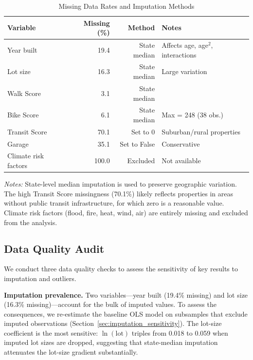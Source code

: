 \begin{table}[H]
\centering
\caption{Missing Data Rates and Imputation Methods}
\label{tab:missing}
\begin{threeparttable}
\small
\begin{tabular}{lrrl}
\toprule
Variable & Missing (\%) & Method & Notes \\
\midrule
Year built & 19.4 & State median & Affects age, age$^2$, interactions \\
Lot size & 16.3 & State median & Large variation \\
Walk Score & 3.1 & State median & \\
Bike Score & 6.1 & State median & Max = 248 (38 obs.) \\
Transit Score & 70.1 & Set to 0 & Suburban/rural properties \\
Garage & 35.1 & Set to False & Conservative \\
Climate risk factors & 100.0 & Excluded & Not available \\
\bottomrule
\end{tabular}
\begin{tablenotes}
\small
\item \textit{Notes:} State-level median imputation is used to preserve geographic variation. The high Transit Score missingness (70.1\%) likely reflects properties in areas without public transit infrastructure, for which zero is a reasonable value. Climate risk factors (flood, fire, heat, wind, air) are entirely missing and excluded from the analysis.
\end{tablenotes}
\end{threeparttable}
\end{table}

\subsection{Data Quality Audit}
\label{sec:data_audit}

We conduct three data quality checks to assess the sensitivity of key results to imputation and outliers.

\textbf{Imputation prevalence.} Two variables---year built (19.4\% missing) and lot size (16.3\% missing)---account for the bulk of imputed values. To assess the consequences, we re-estimate the baseline OLS model on subsamples that exclude imputed observations (Section~\ref{sec:imputation_sensitivity}). The lot-size coefficient is the most sensitive: $\ln(\text{lot})$ triples from 0.018 to 0.059 when imputed lot sizes are dropped, suggesting that state-median imputation attenuates the lot-size gradient substantially.

